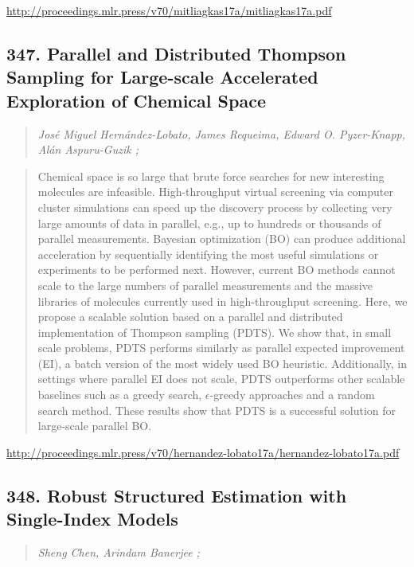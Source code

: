\documentclass{article}
\begin{document}
\href{http://proceedings.mlr.press/v70/mitliagkas17a/mitliagkas17a.pdf}{http://proceedings.mlr.press/v70/mitliagkas17a/mitliagkas17a.pdf}

\subsection{347. Parallel and Distributed Thompson Sampling for Large-scale Accelerated Exploration of Chemical Space}

\begin{quote}
\footnotesize{\textit{José Miguel Hernández-Lobato, James Requeima, Edward O. Pyzer-Knapp, Alán Aspuru-Guzik ;}}
\end{quote}

\begin{quote}
    Chemical space is so large that brute force searches for new interesting molecules are infeasible. High-throughput virtual screening via computer cluster simulations can speed up the discovery process by collecting very large amounts of data in parallel, e.g., up to hundreds or thousands of parallel measurements. Bayesian optimization (BO) can produce additional acceleration by sequentially identifying the most useful simulations or experiments to be performed next. However, current BO methods cannot scale to the large numbers of parallel measurements and the massive libraries of molecules currently used in high-throughput screening. Here, we propose a scalable solution based on a parallel and distributed implementation of Thompson sampling (PDTS). We show that, in small scale problems, PDTS performs similarly as parallel expected improvement (EI), a batch version of the most widely used BO heuristic. Additionally, in settings where parallel EI does not scale, PDTS outperforms other scalable baselines such as a greedy search, $\epsilon$-greedy approaches and a random search method. These results show that PDTS is a successful solution for large-scale parallel BO.  \end{quote}

\href{http://proceedings.mlr.press/v70/hernandez-lobato17a/hernandez-lobato17a.pdf}{http://proceedings.mlr.press/v70/hernandez-lobato17a/hernandez-lobato17a.pdf}

\subsection{348. Robust Structured Estimation with Single-Index Models}

\begin{quote}
\footnotesize{\textit{Sheng Chen, Arindam Banerjee ;}}
\end{quote}
\end{document}
